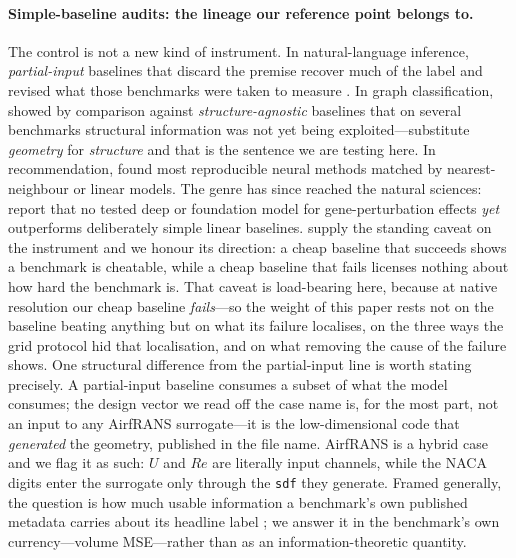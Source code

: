 \paragraph{Simple-baseline audits: the lineage our reference point belongs to.}
The control is not a new kind of instrument. In natural-language inference,
\emph{partial-input} baselines that discard the premise recover much of the label and
revised what those benchmarks were taken to measure
\citep{poliak2018hypothesis,gururangan2018artifacts}. In graph classification,
\citet{errica2020fair} showed by comparison against \emph{structure-agnostic} baselines
that on several benchmarks structural information was not yet being exploited---substitute
\emph{geometry} for \emph{structure} and that is the sentence we are testing here. In
recommendation, \citet{dacrema2019progress} found most reproducible neural methods matched
by nearest-neighbour or linear models. The genre has since reached the natural sciences:
\citet{ahlmanneltze2025deep} report that no tested deep or foundation model for
gene-perturbation effects \emph{yet} outperforms deliberately simple linear baselines.
\citet{feng2019misleading} supply the standing caveat on the instrument and we honour its
direction: a cheap baseline that succeeds shows a benchmark is cheatable, while a cheap
baseline that fails licenses nothing about how hard the benchmark is. That caveat is
load-bearing here, because at native resolution our cheap baseline \emph{fails}---so the
weight of this paper rests not on the baseline beating anything but on what its failure
localises, on the three ways the grid protocol hid that localisation, and on what removing
the cause of the failure shows. One structural
difference from the partial-input line is worth stating precisely. A partial-input baseline
consumes a subset of what the model consumes; the design vector we read off the case name
is, for the most part, not an input to any AirfRANS surrogate---it is the low-dimensional
code that \emph{generated} the geometry, published in the file name. AirfRANS is a hybrid
case and we flag it as such: $U$ and $Re$ are literally input channels, while the NACA
digits enter the surrogate only through the \texttt{sdf} they generate. Framed generally,
the question is how much usable information a benchmark's own published metadata carries
about its headline label \citep{ethayarajh2022vusable}; we answer it in the benchmark's own
currency---volume MSE---rather than as an information-theoretic quantity.

